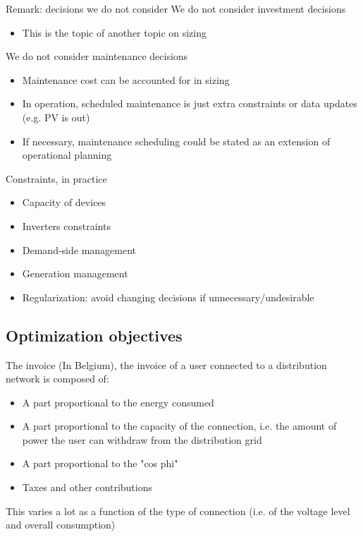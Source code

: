 \begin{frame}{Remark: decisions we do not consider}
We do not consider investment decisions
\begin{itemize}
  \item This is the topic of another topic on sizing
\end{itemize}

We do not consider maintenance decisions
\begin{itemize}
  \item Maintenance cost can be accounted for in sizing
  \item In operation, scheduled maintenance is just extra constraints or data updates (e.g. PV is out)
  \item If necessary, maintenance scheduling could be stated as an extension of operational planning
\end{itemize}
\end{frame} 

\begin{frame}{Constraints, in practice}
\begin{itemize}
  \item Capacity of devices
  \item Inverters constraints
  \item Demand-side management
  \item Generation management
  \item Regularization: avoid changing decisions if unnecessary/undesirable
\end{itemize}


\end{frame} 

\subsection{Optimization objectives}
\begin{frame}{The invoice}
 (In Belgium), the invoice of a user connected to a distribution network is composed of:
  \begin{itemize}
  \item A part proportional to the energy consumed
  \item A part proportional to the capacity of the connection, i.e. the amount of power the user can withdraw from the distribution grid
  \item A part proportional to the "cos phi"
  \item Taxes and other contributions
\end{itemize}
This varies a lot as a function of the type of connection (i.e. of the voltage level and overall consumption)

\end{frame} 


